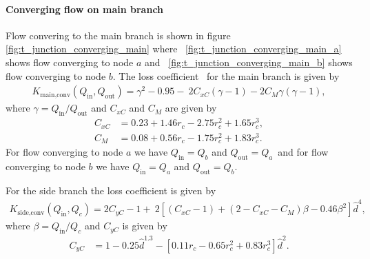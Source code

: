 \paragraph{Converging flow on main branch}

Flow convering to the main branch is shown in figure \ref{fig:t_junction_converging_main} where \ 
\ref{fig:t_junction_converging_main_a} shows flow converging to node $a$ and \ 
\ref{fig:t_junction_converging_main_b} shows flow converging to node $b$. The loss coefficient \ 
for the main branch is given by
\begin{align} \label{eq:K_main_conv}
    K_{\text{main,conv}}(Q_{\text{in}}, Q_{\text{out}}) = \gamma^2 - 0.95 - \ 
    2C_{xC} \left(\gamma - 1 \right) - 2C_M \gamma ( \gamma - 1 ), 
\end{align}
where $\gamma = Q_{\text{in}} / Q_{\text{out}}$ and $C_{xC}$ and $C_M$ are given by
\begin{align}
    C_{xC} &= 0.23 + 1.46 r_c -2.75 r_c^2 + 1.65 r_c^3 , \\
    C_M &= 0.08 + 0.56 r_c -1.75 r_c^2 + 1.83 r_c^3.
\end{align}
For flow converging to node $a$ we have $Q_{\text{in}} = Q_b$ and $Q_{\text{out}}=Q_a$\
and for flow converging to node $b$ we have $Q_{\text{in}} = Q_a$ and $Q_{\text{out}}=Q_b$. 

For the side branch the loss coefficient is given by
\begin{align} \label{eq:K_side_conv}
    K_{\text{side,conv}}(Q_{\text{in}}, Q_c) = 2 C_{yC} - 1 + \
    2\left[\left(C_{xC}-1\right) + \left(2-C_{xC}-C_M \right) \beta - 0.46\beta^2 \right]\hat{d}^4,
\end{align}
where $\beta = Q_{\text{in}} / Q_c$ and $C_{yC}$ is given by
\begin{align}
    C_{yC} &= 1 - 0.25\hat{d}^{1.3} - \left[ 0.11 r_c -0.65 r_c^2 + 0.83 r_c^3 \right] \hat{d}^2.
\end{align}


